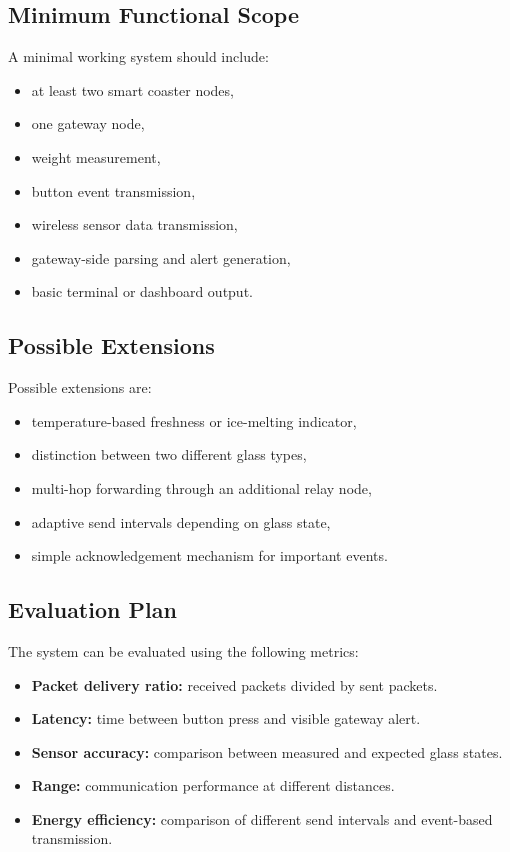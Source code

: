 \documentclass[11pt,a4paper]{article}
\newcommand{\projecttitle}[1]{\subsection*{#1}}
\begin{document}
\projecttitle{Minimum Functional Scope}

A minimal working system should include:

\begin{itemize}
    \item at least two smart coaster nodes,
    \item one gateway node,
    \item weight measurement,
    \item button event transmission,
    \item wireless sensor data transmission,
    \item gateway-side parsing and alert generation,
    \item basic terminal or dashboard output.
\end{itemize}

\projecttitle{Possible Extensions}

Possible extensions are:

\begin{itemize}
    \item temperature-based freshness or ice-melting indicator,
    \item distinction between two different glass types,
    \item multi-hop forwarding through an additional relay node,
    \item adaptive send intervals depending on glass state,
    \item simple acknowledgement mechanism for important events.
\end{itemize}

\projecttitle{Evaluation Plan}

The system can be evaluated using the following metrics:

\begin{itemize}
    \item \textbf{Packet delivery ratio:} received packets divided by sent packets.
    \item \textbf{Latency:} time between button press and visible gateway alert.
    \item \textbf{Sensor accuracy:} comparison between measured and expected glass states.
    \item \textbf{Range:} communication performance at different distances.
    \item \textbf{Energy efficiency:} comparison of different send intervals and event-based transmission.
\end{itemize}
\end{document}
